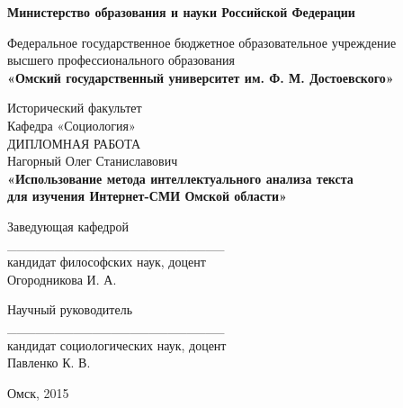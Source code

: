 \begin{titlepage}

\begin{center}
{\bf Министерство образования и науки Российской Федерации} \par

\vspace{5mm}

Федеральное государственное бюджетное образовательное учреждение \\
высшего профессионального образования \\
{\bf «Омский государственный университет им. Ф. М. Достоевского»} 

\vspace{0.5cm}
Исторический факультет\\
Кафедра «Социология»\\
\vspace{2cm}
{\large ДИПЛОМНАЯ РАБОТА}\\
\vspace{2cm}
{\large Нагорный Олег Станиславович}\\
\vspace{1cm}
\textbf{\large «Использование метода интеллектуального анализа текста\\ для изучения Интернет-СМИ Омской области»\\}

\vspace{4cm}

\setlength{\columnsep}{3cm}
\begin{multicols}{2}

		\begin{flushleft}
			Заведующая кафедрой\\
			\vspace{1cm}
			\_\_\_\_\_\_\_\_\_\_\_\_\_\_\_\_\_\_\_\_\_\_\_ \\
			кандидат философских наук, доцент\\
			Огородникова И. А.\\
		\end{flushleft}
		
	\columnbreak
	
		\begin{flushleft}
			Научный руководитель\\
			\vspace{1cm}
			\_\_\_\_\_\_\_\_\_\_\_\_\_\_\_\_\_\_\_\_\_\_\_ \\
			кандидат социологических наук, доцент\\
			Павленко К. В.\\
		\end{flushleft}
\end{multicols}

\vspace{4cm}

Омск, 2015
\end{center}

\end{titlepage}